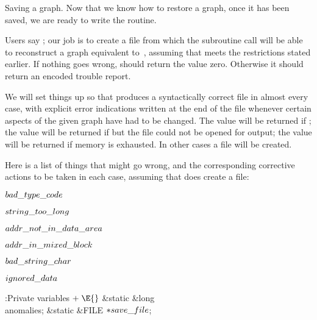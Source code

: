 Saving a graph. Now that we know how to restore a graph, once it has
been saved, we are ready to write the  routine.

Users say ; our job is to create a file
 from which the subroutine call 
will be able to reconstruct a graph equivalent to~, assuming that
 meets the restrictions stated earlier.  If nothing goes wrong,
 should return the value zero.  Otherwise it should return
an encoded trouble report.

We will set things up so that  produces
a syntactically correct file  in almost
every case, with explicit error indications written at the end of the file
whenever certain aspects of the given graph have had to be changed.
The value  will be returned if ; the value
 will be returned if  but the file  could not
be opened for output; the value  will be returned if memory is
exhausted. In other cases a file  will be created.

Here is a list of things that might go wrong, and the corresponding
corrective actions to be taken in each case, assuming that
 does create a file:

\Y\B\4\D$\\{bad\_type\_code}$ \5
\par
\B\4\D$\\{string\_too\_long}$ \5
\par
\B\4\D$\\{addr\_not\_in\_data\_area}$ \5
\par
\B\4\D$\\{addr\_in\_mixed\_block}$ \5
\par
\B\4\D$\\{bad\_string\_char}$ \5
\par
\B\4\D$\\{ignored\_data}$ \5
\par
\Y\B\4:Private variables\X${}\mathrel+\E{}$\6
\&{static} \&{long} \\{anomalies};\6
\&{static} \&{FILE} ${}{*}\\{save\_file}{}$;\par
\fi

